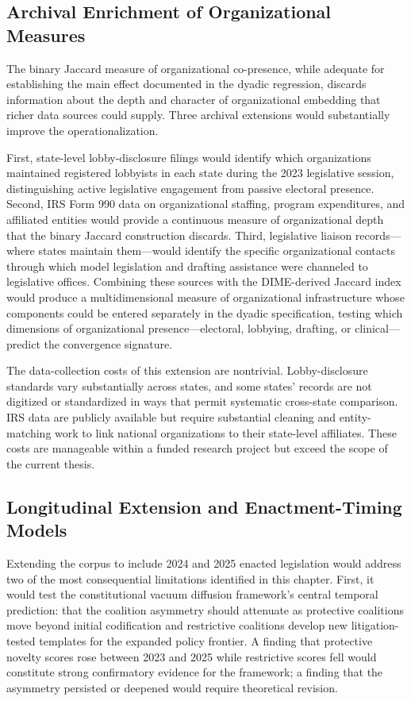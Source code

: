 \subsection{Archival Enrichment of Organizational Measures}
\label{subsec:future-archival}

The binary Jaccard measure of organizational co-presence, while adequate for establishing the main effect documented in the dyadic regression, discards information about the depth and character of organizational embedding that richer data sources could supply. Three archival extensions would substantially improve the operationalization.

First, state-level lobby-disclosure filings would identify which organizations maintained registered lobbyists in each state during the 2023 legislative session, distinguishing active legislative engagement from passive electoral presence. Second, IRS Form 990 data on organizational staffing, program expenditures, and affiliated entities would provide a continuous measure of organizational depth that the binary Jaccard construction discards. Third, legislative liaison records---where states maintain them---would identify the specific organizational contacts through which model legislation and drafting assistance were channeled to legislative offices. Combining these sources with the DIME-derived Jaccard index would produce a multidimensional measure of organizational infrastructure whose components could be entered separately in the dyadic specification, testing which dimensions of organizational presence---electoral, lobbying, drafting, or clinical---predict the convergence signature.

The data-collection costs of this extension are nontrivial. Lobby-disclosure standards vary substantially across states, and some states' records are not digitized or standardized in ways that permit systematic cross-state comparison. IRS data are publicly available but require substantial cleaning and entity-matching work to link national organizations to their state-level affiliates. These costs are manageable within a funded research project but exceed the scope of the current thesis.

\subsection{Longitudinal Extension and Enactment-Timing Models}
\label{subsec:future-longitudinal}

Extending the corpus to include 2024 and 2025 enacted legislation would address two of the most consequential limitations identified in this chapter. First, it would test the constitutional vacuum diffusion framework's central temporal prediction: that the coalition asymmetry should attenuate as protective coalitions move beyond initial codification and restrictive coalitions develop new litigation-tested templates for the expanded policy frontier. A finding that protective novelty scores rose between 2023 and 2025 while restrictive scores fell would constitute strong confirmatory evidence for the framework; a finding that the asymmetry persisted or deepened would require theoretical revision.

